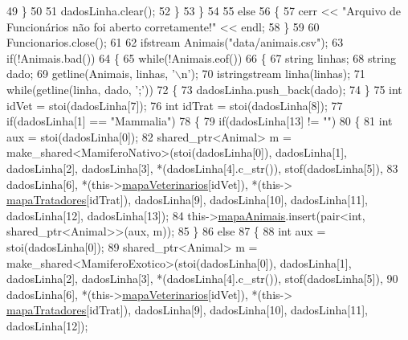 \begin{DoxyCode}
49             \}
50 
51             dadosLinha.clear();
52         \}
53     \}
54 
55     \textcolor{keywordflow}{else}
56     \{
57         cerr << \textcolor{stringliteral}{"Arquivo de Funcionários não foi aberto corretamente!"} << endl;
58     \}
59 
60     Funcionarios.close();
61 
62     ifstream Animais(\textcolor{stringliteral}{"data/animais.csv"});
63     \textcolor{keywordflow}{if}(!Animais.bad())
64     \{
65         \textcolor{keywordflow}{while}(!Animais.eof())
66         \{
67             \textcolor{keywordtype}{string} linhas;
68             \textcolor{keywordtype}{string} dado;
69             getline(Animais, linhas, \textcolor{charliteral}{'\(\backslash\)n'});
70             istringstream linha(linhas);
71             \textcolor{keywordflow}{while}(getline(linha, dado, \textcolor{charliteral}{';'}))
72             \{
73                 dadosLinha.push\_back(dado);
74             \}
75             \textcolor{keywordtype}{int} idVet = stoi(dadosLinha[7]);
76             \textcolor{keywordtype}{int} idTrat = stoi(dadosLinha[8]);
77             \textcolor{keywordflow}{if}(dadosLinha[1] == \textcolor{stringliteral}{"Mammalia"})
78             \{
79                 \textcolor{keywordflow}{if}(dadosLinha[13] != \textcolor{stringliteral}{""})
80                 \{
81                     \textcolor{keywordtype}{int} aux = stoi(dadosLinha[0]);
82                     shared\_ptr<Animal> m = make\_shared<MamiferoNativo>(stoi(dadosLinha[0]), dadosLinha[1], 
      dadosLinha[2], dadosLinha[3], *(dadosLinha[4].c\_str()), stof(dadosLinha[5]),
83                     dadosLinha[6], *(this->\hyperlink{classPetFera_a2bed2112a627bbdb3c0338654330a1ab}{mapaVeterinarios}[idVet]), *(this->
      \hyperlink{classPetFera_ac85920fc6c1471743838e6fe4444304d}{mapaTratadores}[idTrat]), dadosLinha[9], dadosLinha[10], dadosLinha[11], dadosLinha[12], 
      dadosLinha[13]);
84                     this->\hyperlink{classPetFera_ab0ba5fe6332bcffdabb7b03001280697}{mapaAnimais}.insert(pair<\textcolor{keywordtype}{int}, shared\_ptr<Animal>>(aux, m));
85                 \}
86                 \textcolor{keywordflow}{else}
87                 \{
88                     \textcolor{keywordtype}{int} aux = stoi(dadosLinha[0]);
89                     shared\_ptr<Animal> m = make\_shared<MamiferoExotico>(stoi(dadosLinha[0]), dadosLinha[1],
       dadosLinha[2], dadosLinha[3], *(dadosLinha[4].c\_str()), stof(dadosLinha[5]),
90                     dadosLinha[6], *(this->\hyperlink{classPetFera_a2bed2112a627bbdb3c0338654330a1ab}{mapaVeterinarios}[idVet]), *(this->
      \hyperlink{classPetFera_ac85920fc6c1471743838e6fe4444304d}{mapaTratadores}[idTrat]), dadosLinha[9], dadosLinha[10], dadosLinha[11], dadosLinha[12]);

\end{DoxyCode}
